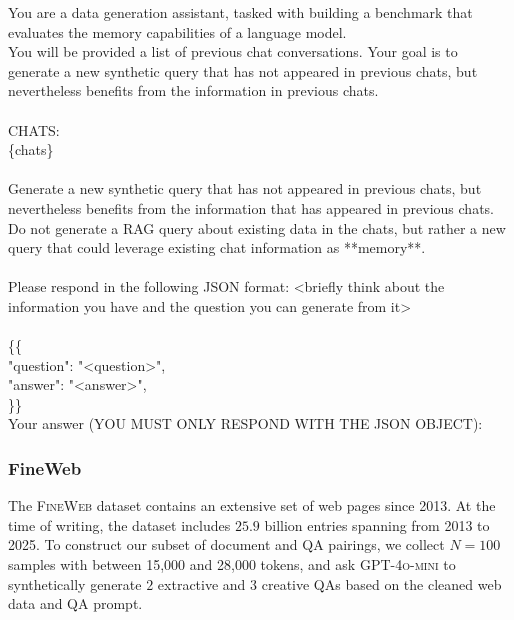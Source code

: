 \documentclass{article} %
\newcommand{\tab}{\hspace*{2em}}
\begin{document}
\begin{examplebox}
    \ttfamily
You are a data generation assistant, tasked with building a benchmark that evaluates the memory capabilities of a language model. \\
You will be provided a list of previous chat conversations. Your goal is to generate a new synthetic query that has not appeared in previous chats, but nevertheless benefits from the information in previous chats.\\
\\
CHATS:\\
\{chats\} \\
\\
Generate a new synthetic query that has not appeared in previous chats, but nevertheless benefits from the information that has appeared in previous chats. \\
Do not generate a RAG query about existing data in the chats, but rather a new query that could leverage existing chat information as **memory**. \\
\\
Please respond in the following JSON format:
<briefly think about the information you have and the question you can generate from it> \\
\\
\{\{ \\
\tab "question": "<question>", \\
\tab "answer": "<answer>", \\
\}\} \\
Your answer (YOU MUST ONLY RESPOND WITH THE JSON OBJECT):
\end{examplebox}

\subsubsection{FineWeb}
\label{sec:appendix-fineweb}
The \textsc{FineWeb} dataset contains an extensive set of web pages since 2013. At the time of writing, the dataset includes $25.9$ billion entries spanning from 2013 to 2025. To construct our subset of document and QA pairings, we collect $N=100$ samples with between 15{,}000 and 28{,}000 tokens, and ask \textsc{GPT-4o-mini} to synthetically generate $2$ extractive and $3$ creative QAs based on the cleaned web data and QA prompt.
\end{document}
